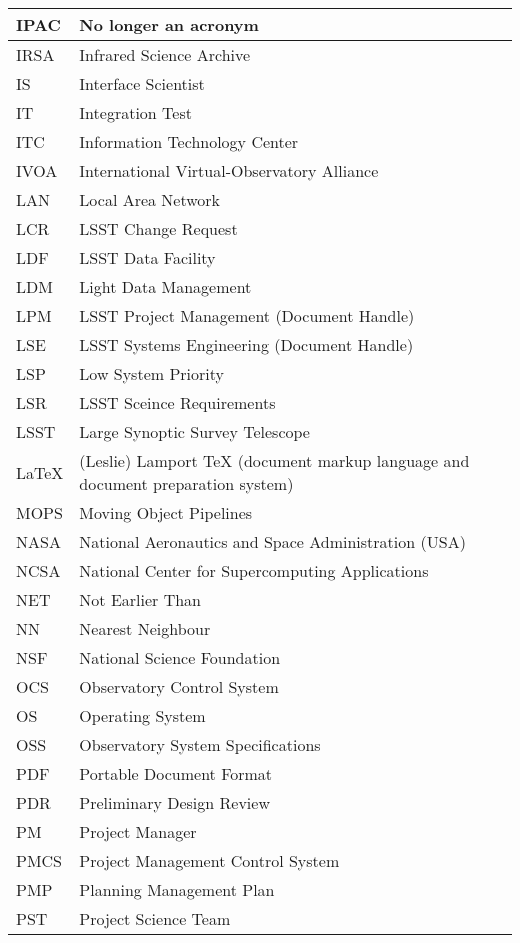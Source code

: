\begin{longtable}{|l|p{}|}
IPAC & No longer an acronym \\\hline
IRSA & Infrared Science Archive \\\hline
IS & Interface Scientist \\\hline
IT & Integration Test \\\hline
ITC & Information Technology Center \\\hline
IVOA & International Virtual-Observatory Alliance \\\hline
LAN & Local Area Network \\\hline
LCR & LSST Change Request \\\hline
LDF & LSST Data Facility \\\hline
LDM & Light Data Management \\\hline
LPM & LSST Project Management (Document Handle) \\\hline
LSE & LSST Systems Engineering (Document Handle) \\\hline
LSP & Low System Priority \\\hline
LSR & LSST Sceince Requirements \\\hline
LSST & Large Synoptic Survey Telescope \\\hline
LaTeX & (Leslie) Lamport TeX (document markup language and document preparation system) \\\hline
MOPS & Moving Object Pipelines \\\hline
NASA & National Aeronautics and Space Administration (USA) \\\hline
NCSA & National Center for Supercomputing Applications \\\hline
NET & Not Earlier Than \\\hline
NN & Nearest Neighbour \\\hline
NSF & National Science Foundation \\\hline
OCS & Observatory Control System \\\hline
OS & Operating System \\\hline
OSS & Observatory System Specifications \\\hline
PDF & Portable Document Format \\\hline
PDR & Preliminary Design Review \\\hline
PM & Project Manager \\\hline
PMCS & Project Management Control System \\\hline
PMP & Planning Management Plan \\\hline
PST & Project Science Team \\\hline

\end{longtable}
